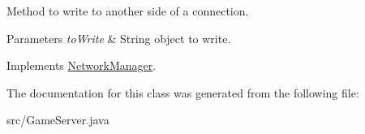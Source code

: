 Method to write to another side of a connection. 


\begin{DoxyParams}{Parameters}
{\em to\+Write} & String object to write. \\
\hline
\end{DoxyParams}


Implements \hyperlink{interfaceNetworkManager_a3c292bfd3d98fa5d04a14c493b8f14b0}{Network\+Manager}.



The documentation for this class was generated from the following file\+:\begin{DoxyCompactItemize}
\item 
src/Game\+Server.\+java\end{DoxyCompactItemize}
